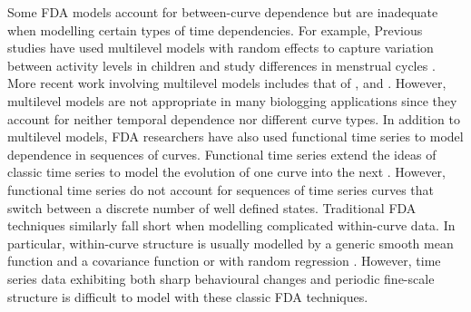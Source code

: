 Some FDA models account for between-curve dependence but are inadequate when modelling certain types of time dependencies. %
For example, 
Previous studies have used multilevel models with random effects to capture variation between activity levels in children \citep{Morris:2007} and study differences in menstrual cycles \citet{Bromback:1998}. More recent work involving multilevel models includes that of \citet{Di:2009}, \citet{Chen:2012} and \citet{Crainiceanu:2009}. However, multilevel models are not appropriate in many biologging applications since they account for neither temporal dependence nor different curve types. 
In addition to multilevel models, FDA researchers have also used functional time series to model dependence in sequences of curves. Functional time series extend the ideas of classic time series to model the evolution of one curve into the next \citep{Kokoszka:2018}. %
However, functional time series do not account for sequences of time series curves that switch between a discrete number of well defined states.
%
Traditional FDA techniques similarly fall short when modelling complicated within-curve %
data. In particular, within-curve structure is usually modelled by a generic smooth mean function and a covariance function \citep{Yao:2005} 
or with random regression \citep{Rice:2001}. 
However, time series data exhibiting both sharp behavioural changes and periodic fine-scale structure is difficult to model with these classic FDA techniques.

